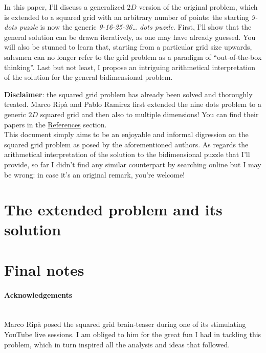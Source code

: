 \documentclass[11pt]{article}
\begin{document}
	In this paper, I'll discuss a generalized \(2D\) version of the original
	problem, which is extended to a squared grid with an arbitrary number of
	points: the starting \emph{9-dots puzzle} is now the generic
	\emph{9-16-25-36\ldots{} dots puzzle}. First, I'll show that the general
	solution can be drawn iteratively, as one may have already guessed. You
	will also be stunned to learn that, starting from a particular grid size
	upwards, salesmen can no longer refer to the grid problem as a paradigm
	of ``out-of-the-box thinking''. Last but not least, I propose an
	intriguing arithmetical interpretation of the solution for the general
	bidimensional problem.

	\textbf{Disclaimer}: the squared grid problem has already been solved
	and thoroughly treated. Marco Ripà and Pablo Ramirez first extended the
	nine dots problem to a generic \(2D\) squared grid and then also to
	multiple dimensions! You can find their papers in the \hyperlink{references}{References} section.\\
	This document simply aims to be an enjoyable and informal digression on
	the squared grid problem as posed by the aforementioned authors. As
	regards the arithmetical interpretation of the solution to the
	bidimensional puzzle that I'll provide, so far I didn't find any similar
	counterpart by searching online but I may be wrong: in case it's an
	original remark, you're welcome!

	\hypertarget{the-extended-problem-and-its-solution} {
		\section{The extended problem and its solution}
		\label{the-extended-problem-and-its-solution}
	}

	\hypertarget{final-notes}{
		\section{Final notes}
		\label{final-notes}
	}

	\paragraph{Acknowledgements} \mbox{} \\ %
	Marco Ripà posed the squared grid brain-teaser during one of its
	stimulating YouTube live sessions. I am obliged to him for the great fun
	I had in tackling this problem, which in turn inspired all the analysis
	and ideas that followed.
\end{document}
